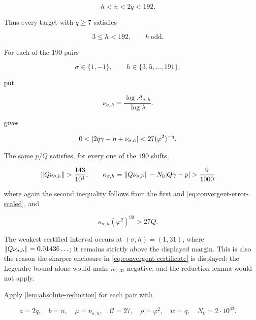 \begin{equation}
 h<n<2q<192.
\end{equation}

Thus every target with $q\geqslant7$ satisfies

\begin{equation}
 3\leqslant h<192,
 \qquad
 h\ \text{odd}.
 \label{eq:h-192}
\end{equation}

For each of the $190$ pairs

\begin{equation}
 \sigma\in\{1,-1\},
 \qquad
 h\in\{3,5,\ldots,191\},
\end{equation}

put

\begin{equation}
 \nu_{\sigma,h}
 =\frac{\log\mathcal A_{\sigma,h}}{\log\lambda}.
\end{equation}

 gives

\begin{equation}
 0<\lvert2q\gamma-n+\nu_{\sigma,h}\rvert
 <27(\varphi^2)^{-q}.
 \label{eq:moving-reduction-form}
\end{equation}

The same $p/Q$ satisfies, for every one of the $190$ shifts,

\begin{equation}
 \left\lVert Q\nu_{\sigma,h}\right\rVert>\frac{143}{10^4},
 \qquad
 \kappa_{\sigma,h}
 =\left\lVert Q\nu_{\sigma,h}\right\rVert-N_0\lvert Q\gamma-p\rvert>\frac9{1000}
 \label{eq:moving-eta}
\end{equation}

where again the second inequality follows from the first and
\cref{eq:convergent-error-scaled}, and

\begin{equation}
 \kappa_{\sigma,h}(\varphi^2)^{90}>27Q.
 \label{eq:moving-cutoff}
\end{equation}

The weakest certified interval occurs at $(\sigma,h)=(1,31)$, where
$\left\lVert Q\nu_{\sigma,h}\right\rVert=0.01436\ldots$; it remains strictly above the
displayed margin. This is also the reason the sharper enclosure in
\cref{eq:convergent-certificate} is displayed: the Legendre bound alone
would make $\kappa_{1,31}$ negative, and the reduction lemma would not
apply.

Apply \cref{lem:absolute-reduction}
for each pair with

\begin{equation}
 a=2q,\quad b=n,\quad \mu=\nu_{\sigma,h},\quad
 \mathcal C=27,\quad \rho=\varphi^2,\quad w=q,\quad N_0=2\mathbin{\cdot}10^{32}.
\end{equation}

